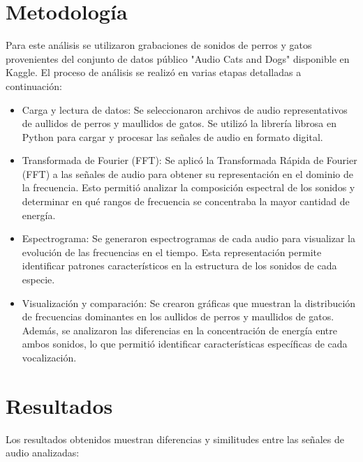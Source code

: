 \documentclass[journal]{IEEEtran}
\begin{document}
\section{Metodología}
Para este análisis se utilizaron grabaciones de sonidos de perros y gatos provenientes del conjunto de datos público "Audio Cats and Dogs" disponible en Kaggle. El proceso de análisis se realizó en varias etapas detalladas a continuación:
\begin{itemize}
    \item Carga y lectura de datos: Se seleccionaron archivos de audio representativos de aullidos de perros y maullidos de gatos. Se utilizó la librería librosa en Python para cargar y procesar las señales de audio en formato digital.
    \item Transformada de Fourier (FFT): Se aplicó la Transformada Rápida de Fourier (FFT) a las señales de audio para obtener su representación en el dominio de la frecuencia. Esto permitió analizar la composición espectral de los sonidos y determinar en qué rangos de frecuencia se concentraba la mayor cantidad de energía.
    \item Espectrograma: Se generaron espectrogramas de cada audio para visualizar la evolución de las frecuencias en el tiempo. Esta representación permite identificar patrones característicos en la estructura de los sonidos de cada especie.
    \item Visualización y comparación: Se crearon gráficas que muestran la distribución de frecuencias dominantes en los aullidos de perros y maullidos de gatos. Además, se analizaron las diferencias en la concentración de energía entre ambos sonidos, lo que permitió identificar características específicas de cada vocalización.
\end{itemize}

\section{Resultados}
Los resultados obtenidos muestran diferencias y similitudes entre las señales de audio analizadas:
\end{document}
